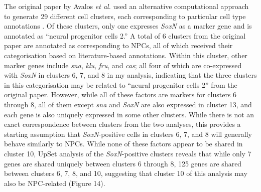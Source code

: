 \documentclass[withindex,glossary]{cam-thesis}
\begin{document}
The original paper by Avalos \emph{et al.} used an alternative
computational approach to generate 29 different cell clusters, each
corresponding to particular cell type annotations . Of these clusters, only one expresses \emph{SoxN} as a marker
gene and is annotated as ``neural progenitor cells 2.'' A total of 6
clusters from the original paper are annotated as corresponding to NPCs,
all of which received their categorisation based on literature-based
annotations. Within this cluster, other marker genes include \emph{sna},
\emph{klu}, \emph{fru}, and \emph{cas}; all four of which are
co-expressed with \emph{SoxN} in clusters 6, 7, and 8 in my analysis,
indicating that the three clusters in this categorisation may be related
to ``neural progenitor cells 2'' from the original paper. However, while
all of these factors are markers for clusters 6 through 8, all of them
except \emph{sna} and \emph{SoxN} are also expressed in cluster 13, and
each gene is also uniquely expressed in some other clusters. While there
is not an exact correspondence between clusters from the two analyses,
this provides a starting assumption that \emph{SoxN}-positive cells in
clusters 6, 7, and 8 will generally behave similarly to NPCs. While none
of these factors appear to be shared in cluster 10, UpSet analysis of
the \emph{SoxN}-positive clusters reveals that while only 7 genes are
shared uniquely between clusters 6 through 8, 125 genes are shared
between clusters 6, 7, 8, and 10, suggesting that cluster 10 of this
analysis may also be NPC-related (Figure 14).
\end{document}
